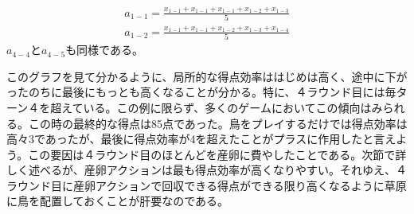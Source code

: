 \begin{multicols}{2}
\begin{gather*}
  a_{1-1}=\frac{x_{1-1}+x_{1-1}+x_{1-1}+x_{1-2}+x_{1-3}}{5}\\
  a_{1-2}=\frac{x_{1-1}+x_{1-1}+x_{1-2}+x_{1-3}+x_{1-4}}{5}
\end{gather*}
$a_{4-4}$と$a_{4-5}$も同様である。
\par
このグラフを見て分かるように、局所的な得点効率ははじめは高く、途中に下がったのちに最後にもっとも高くなることが分かる。特に、４ラウンド目には毎ターン４を超えている。この例に限らず、多くのゲームにおいてこの傾向はみられる。この時の最終的な得点は85点であった。鳥をプレイするだけでは得点効率は高々3であったが、最後に得点効率が4を超えたことがプラスに作用したと言えよう。この要因は４ラウンド目のほとんどを産卵に費やしたことである。次節で詳しく述べるが、産卵アクションは最も得点効率が高くなりやすい。それゆえ、４ラウンド目に産卵アクションで回収できる得点ができる限り高くなるように草原に鳥を配置しておくことが肝要なのである。

\end{multicols}
